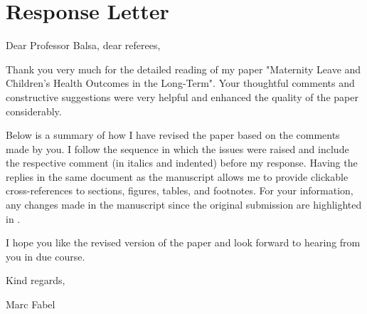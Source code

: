 
\singlespacing
\tableofcontents
\onehalfspacing
\clearpage


\section{Response Letter}

\vspace{5em}

Dear Professor Balsa, dear referees, 

Thank you very much for the detailed reading of my paper "Maternity Leave and Children's Health Outcomes in the Long-Term". Your thoughtful comments and constructive suggestions were very helpful and enhanced the quality of the paper considerably. 

Below is a summary of how I have revised the paper based on the comments made by you. I follow the sequence in which the issues were raised and include the respective comment (in italics and indented) before my response. Having the replies in the same document as the manuscript allows me to provide clickable cross-references to sections, figures, tables, and footnotes. For your information, any changes made in the manuscript since the original submission are highlighted in . 

I hope you like the revised version of the paper and look forward to hearing from you in due course. 

Kind regards,

Marc Fabel 




